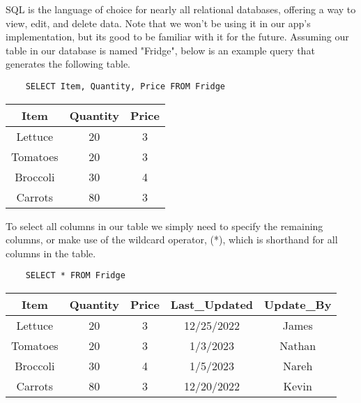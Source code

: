 \begin{kaobox}[title=Working with SQL]
    SQL is the language of choice for nearly all relational databases, offering a way to view, edit, and delete data. Note that we won't be using it in our app's implementation, but its good to be familiar with it for the future. Assuming our table in our database is named "Fridge", below is an example query that generates the following table.

    \begin{verbatim}
    SELECT Item, Quantity, Price FROM Fridge
    \end{verbatim}

    \begin{center}
        \begin{tabular}{ |c|c|c| } 
            \hline
            \textbf{Item} & \textbf{Quantity} & \textbf{Price} \\ 
            \hline
            Lettuce & 20 & 3 \\ 
            \hline
            Tomatoes & 20 & 3 \\ 
            \hline
            Broccoli & 30 & 4 \\ 
            \hline
            Carrots & 80 & 3 \\ 
            \hline
        \end{tabular}
    \end{center}

    To select all columns in our table we simply need to specify the remaining columns, or make use of the wildcard operator, (*), which is shorthand for all columns in the table.

    \begin{verbatim}
    SELECT * FROM Fridge
    \end{verbatim}
    \begin{center}
        \begin{tabular}{ |c|c|c|c|c| } 
            \hline
            \textbf{Item} & \textbf{Quantity} & \textbf{Price} & \textbf{Last\_Updated} & \textbf{Update\_By} \\ 
            \hline
            Lettuce & 20 & 3 & 12/25/2022 & James \\ 
            \hline
            Tomatoes & 20 & 3 & 1/3/2023 & Nathan \\ 
            \hline
            Broccoli & 30 & 4 & 1/5/2023 & Nareh \\ 
            \hline
            Carrots & 80 & 3 & 12/20/2022 & Kevin \\ 
            \hline
        \end{tabular}
    \end{center}


\end{kaobox}
